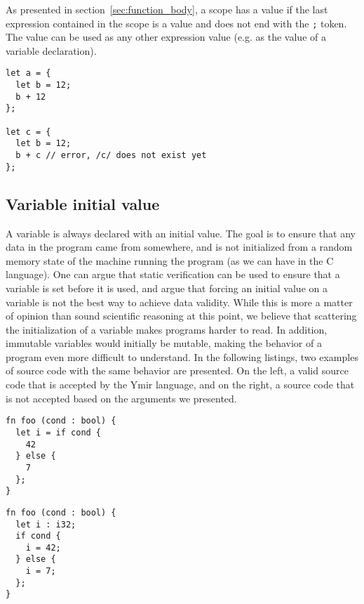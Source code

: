 As presented in section~\ref{sec:function_body}, a scope has a value if the last
expression contained in the scope is a value and does not end with the
\texttt{;} token. The value can be used as any other expression value (e.g. as
the value of a variable declaration).

\begin{lstlisting}[style=coloredverbatim]
let a = {
  let b = 12;
  b + 12
};

let c = {
  let b = 12;
  b + c // error, /c/ does not exist yet
};
\end{lstlisting}

\subsection{Variable initial value}

A variable is always declared with an initial value. The goal is to ensure that
any data in the program came from somewhere, and is not initialized from a
random memory state of the machine running the program (as we can have in the C
language). One can argue that static verification can be used to ensure that a
variable is set before it is used, and argue that forcing an initial value on a
variable is not the best way to achieve data validity. While this is more a
matter of opinion than sound scientific reasoning at this point, we believe that
scattering the initialization of a variable makes programs harder to read. In
addition, immutable variables would initially be mutable, making the behavior of
a program even more difficult to understand. In the following listings, two
examples of source code with the same behavior are presented. On the left, a
valid source code that is accepted by the Ymir language, and on the right, a
source code that is not accepted based on the arguments we presented.

\hspace{-10pt}%
\begin{minipage}[t][][t]{0.47\linewidth}
  \begin{lstlisting}[style=coloredverbatim, caption=Valid]
fn foo (cond : bool) {
  let i = if cond {
    42
  } else {
    7
  };
}
  \end{lstlisting}
\end{minipage}\hspace{10pt}%
\begin{minipage}[t][][t]{0.47\linewidth}
  \begin{lstlisting}[style=coloredverbatim, caption=Invalid]
fn foo (cond : bool) {
  let i : i32;
  if cond {
    i = 42;
  } else {
    i = 7;
  };
}
  \end{lstlisting}
\end{minipage}



